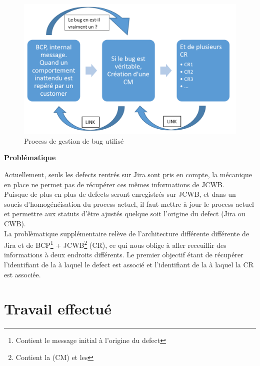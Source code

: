 \begin{figure}[h]
  \centering
      \includegraphics[width=\textwidth]{images/bugManagementProcess.png}
  \caption{Process de gestion de bug utilisé}
	\label{figure:bugManagementProcess}
\end{figure}




\textbf{Problématique}\hfill \\ \indent

Actuellement, seuls les defects rentrés sur Jira sont pris en compte, la mécanique en place ne permet pas de récupérer ces mêmes informations de JCWB. \\
Puisque de plus en plus de defects seront enregistrés sur JCWB, et dans un soucis d'homogénéisation du process actuel, il faut mettre à jour le process actuel et permettre aux statuts d'être ajustés quelque soit l'origine du defect (Jira ou CWB).\\
La problèmatique supplémentaire relève de l'architecture différente différente de Jira et de BCP\footnote{Contient le message initial à l'origine du defect} + JCWB\footnote{Contient la  (CM) et les } (CR), ce qui nous oblige à aller receuillir des informations à deux endroits différents. Le premier objectif étant de récupérer l'identifiant de la  à laquel le defect est associé et l'identifiant de la  à laquel la CR est associée.\\






\section{Travail effectué}


